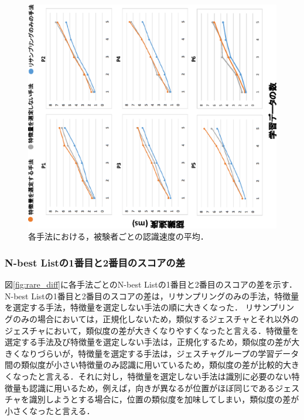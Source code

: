 \begin{figure}[!h]
\centering
\includegraphics[width=0.85\columnwidth,angle=-90]{img/pre_speed.eps}
\caption{各手法における，被験者ごとの認識速度の平均．}
\label{fig:rare_speed}
\end{figure}

\subsubsection{N-best Listの1番目と2番目のスコアの差}
図\ref{fig:rare_diff}に各手法ごとのN-best Listの1番目と2番目のスコアの差を示す．
N-best Listの1番目と2番目のスコアの差は，リサンプリングのみの手法，特徴量を選定する手法，特徴量を選定しない手法の順に大きくなった．
リサンプリングのみの場合においては，正規化しないため，類似するジェスチャとそれ以外のジェスチャにおいて，類似度の差が大きくなりやすくなったと言える．特徴量を選定する手法及び特徴量を選定しない手法は，正規化するため，類似度の差が大きくなりづらいが，特徴量を選定する手法は，ジェスチャグループの学習データ間の類似度が小さい特徴量のみ認識に用いているため，類似度の差が比較的大きくなったと言える．それに対し，特徴量を選定しない手法は識別に必要のない特徴量も認識に用いるため，例えば，向きが異なるが位置がほぼ同じであるジェスチャを識別しようとする場合に，位置の類似度を加味してしまい，類似度の差が小さくなったと言える．

